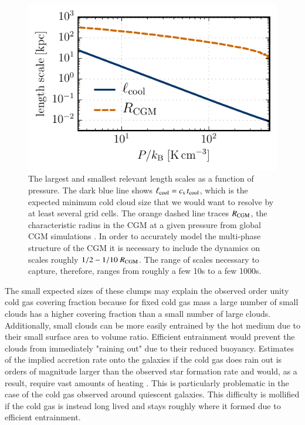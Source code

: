 \documentclass[11pt,letterpaper,english]{article}
\begin{document}
\begin{figure}[t]
    \centering
    \begin{minipage}{0.45\textwidth}
	\caption{ The largest and smallest relevant length scales as a function of pressure. The dark blue line shows $\ell_{\rm cool} = c_{\rm s} \, t_{\rm cool}$, which is the expected minimum cold cloud size \cite{McCourt18} that we would want to resolve by at least several grid cells. The orange dashed line traces $R_{\rm CGM}$, the characteristic radius in the CGM at a given pressure from global CGM simulations \cite{Fielding17}. In order to accurately model the multi-phase structure of the CGM it is necessary to include the dynamics on scales roughly $1/2 - 1/10 \ R_{\rm CGM}$. The range of scales necessary to capture, therefore, ranges from roughly a few 10s to a few 1000s. \label{fig:cs_tcool}}
    \end{minipage}\hfill
    \begin{minipage}{0.55\textwidth}
        \includegraphics[width=\textwidth]{../figures/length_scales_sim.pdf} 
    \end{minipage}
\end{figure}


The small expected sizes of these clumps may explain the observed order unity cold gas covering fraction because for fixed cold gas mass a large number of small clouds has a higher covering fraction than a small number of large clouds. Additionally, small clouds can be more easily entrained by the hot medium due to their small surface area to volume ratio. Efficient entrainment would prevent the clouds from immediately "raining out" due to their reduced buoyancy. Estimates of the implied accretion rate onto the galaxies if the cold gas does rain out is orders of magnitude larger than the observed star formation rate and would, as a result, require vast amounts of heating \cite{McQuinnWerk}. This is particularly problematic in the case of the cold gas observed around quiescent galaxies. This difficulty is mollified if the cold gas is instead long lived and stays roughly where it formed due to efficient entrainment.
\end{document}

